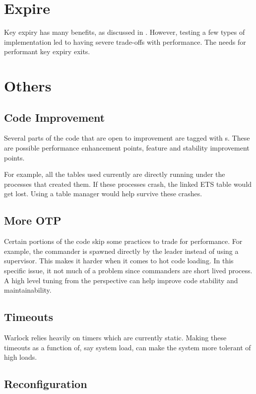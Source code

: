 \section{Expire}

Key expiry has many benefits, as discussed in . 
However, testing a few types of implementation led to having severe trade-offs
with performance. The needs for performant key expiry exits.

\section{Others}

\subsection{Code Improvement}

Several parts of the code that are open to improvement are tagged with 
s. These are possible performance enhancement points, feature and
stability improvement points. 

For example, all the  tables used currently
are directly running under the processes that created them. If these processes
crash, the linked ETS table would get lost. Using a table manager would
help survive these crashes.

\subsection{More OTP}

Certain portions of the code skip some  practices to trade for
performance.
For example, the commander is spawned directly by the leader instead of using
a supervisor. This makes it harder when it comes to hot code loading. In this
specific issue, it not much of a problem since commanders are short lived
process. A high level tuning from the  perspective can help improve
code stability and maintainability.

\subsection{Timeouts}

Warlock relies heavily on timers which are currently static. Making these
timeouts as a function of, say system load, can make the system more tolerant
of high loads.

\subsection{Reconfiguration}


